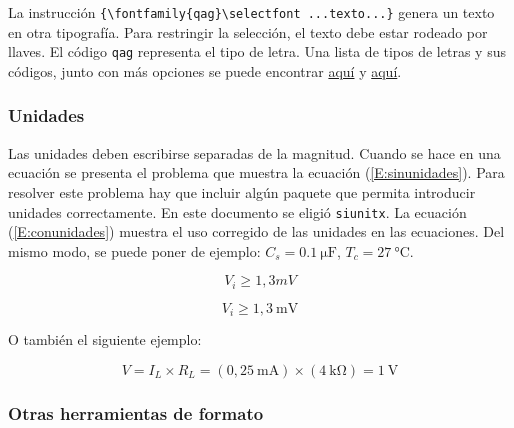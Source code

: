 \documentclass[12pt,letterpaper]{article}
\begin{document}
La instrucción \verb+{\fontfamily{qag}\selectfont ...texto...}+ genera {\selectfont un texto en otra tipografía. Para restringir la selección, el texto debe estar rodeado por llaves}. El código \texttt{qag} representa el tipo de letra. Una lista de tipos de letras y sus códigos, junto con más opciones se puede encontrar \href{https://www.sharelatex.com/learn/Font_typefaces}{aquí} y \href{http://tex.stackexchange.com/questions/25249/how-do-i-use-a-particular-font-for-a-small-section-of-text-in-my-document}{aquí}.

\subsubsection{Unidades}

Las unidades deben escribirse separadas de la magnitud. Cuando se hace en una ecuación se presenta el problema que muestra la ecuación (\ref{E:sinunidades}). Para resolver este problema hay que incluir algún paquete que permita introducir unidades correctamente. En este documento se eligió \verb+siunitx+. La ecuación (\ref{E:conunidades}) muestra el uso corregido de las unidades en las ecuaciones. Del mismo modo, se puede poner de ejemplo: $C_s = \SI{0.1}{\micro\farad}$, $T_c = \SI{27}{\degreeCelsius}$. 

\begin{equation}\label{E:sinunidades}
{V}_{i}\ge 1,3 mV
\end{equation}

\begin{equation}\label{E:conunidades}
{V}_{i} \ge 1,3~\si{\milli\volt}
\end{equation}

O también el siguiente ejemplo:

\begin{equation}\label{E:unidades}
V = I_L \times R_L = \left( 0,25~\si{\milli\ampere} \right) \times \left( \SI{4}{\kilo\ohm} \right) = 1~\si{\volt} 
\end{equation}

\subsubsection{Otras herramientas de formato}
\end{document}
